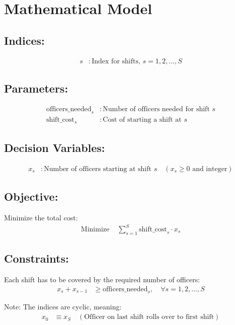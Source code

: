 \documentclass{article}
\begin{document}
\section*{Mathematical Model}

\subsection*{Indices:}
\begin{align*}
s & : \text{Index for shifts, } s = 1, 2, \ldots, S
\end{align*}

\subsection*{Parameters:}
\begin{align*}
\text{officers\_needed}_s & : \text{Number of officers needed for shift } s \\
\text{shift\_cost}_s & : \text{Cost of starting a shift at } s
\end{align*}

\subsection*{Decision Variables:}
\begin{align*}
x_s & : \text{Number of officers starting at shift } s \quad (x_s \geq 0 \text{ and integer})
\end{align*}

\subsection*{Objective:}
Minimize the total cost:
\begin{align*}
\text{Minimize } & \sum_{s=1}^{S} \text{shift\_cost}_s \cdot x_s
\end{align*}

\subsection*{Constraints:}
Each shift has to be covered by the required number of officers:
\begin{align*}
x_s + x_{s-1} & \geq \text{officers\_needed}_s, \quad \forall s = 1, 2, \ldots, S
\end{align*}

Note: The indices are cyclic, meaning:
\begin{align*}
x_{0} & \equiv x_S \quad (\text{Officer on last shift rolls over to first shift})
\end{align*}
\end{document}
